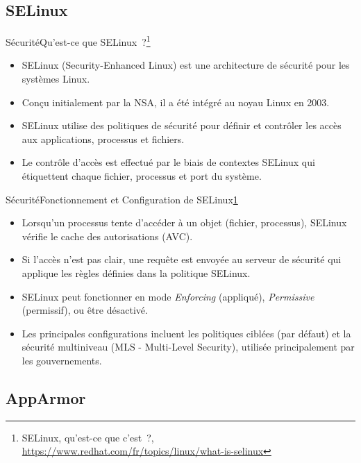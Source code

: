 \documentclass{beamer}
\begin{document}
    \subsection{SELinux}\label{subsec:selinux}

    \begin{frame}{Sécurité}{Qu'est-ce que SELinux~?\footnote{\label{selinux-redhat}SELinux, qu'est-ce que c'est~?, \url{https://www.redhat.com/fr/topics/linux/what-is-selinux}}}
        \begin{itemize}
            \item SELinux (Security-Enhanced Linux) est une architecture de sécurité pour les systèmes Linux.
            \item Conçu initialement par la NSA, il a été intégré au noyau Linux en 2003.
            \item SELinux utilise des politiques de sécurité pour définir et contrôler les accès aux applications, processus et fichiers.
            \item Le contrôle d'accès est effectué par le biais de contextes SELinux qui étiquettent chaque fichier, processus et port du système.
        \end{itemize}
    \end{frame}

    \begin{frame}{Sécurité}{Fonctionnement et Configuration de SELinux\cref{selinux-redhat}}
        \begin{itemize}
            \item Lorsqu'un processus tente d'accéder à un objet (fichier, processus), SELinux vérifie le cache des autorisations (AVC).
            \item Si l'accès n'est pas clair, une requête est envoyée au serveur de sécurité qui applique les règles définies dans la politique SELinux.
            \item SELinux peut fonctionner en mode \textit{Enforcing} (appliqué), \textit{Permissive} (permissif), ou être désactivé.
            \item Les principales configurations incluent les politiques ciblées (par défaut) et la sécurité multiniveau (MLS - Multi-Level Security), utilisée principalement par les gouvernements.
        \end{itemize}
    \end{frame}

    \subsection{AppArmor}\label{subsec:apparmor}
\end{document}
